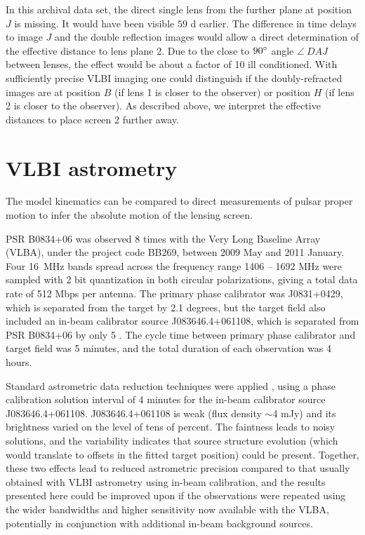 \documentclass[useAMS,usenatbib]{mn2e}
\begin{document}

In this archival data set, the direct single lens from the further
plane at position $J$ is missing.  It would have been visible $59$ d
earlier. The difference in time delays to image $J$ and the double
reflection images would allow a direct determination of the effective
distance to lens plane 2.  Due to the close to $90 \degree$ angle $\angle~DAJ$
between lenses, the effect would be about a factor of 10 ill
conditioned.  With sufficiently precise VLBI imaging one could
distinguish if the doubly-refracted images are at position $B$ (if
lens 1 is closer to the observer) or position $H$ (if lens 2 is closer to the observer).  As described above, we interpret
the effective distances to place screen 2 further away.


\section{VLBI astrometry}
\label{sec:astrometry}

The model kinematics can be compared to direct measurements of pulsar
proper motion to infer the absolute motion of the lensing screen.

PSR B0834+06 was observed 8 times with the Very Long Baseline Array (VLBA), under the project code BB269, between 2009 May and 2011 January.  Four 16~MHz bands spread across the frequency range 1406 -- 1692 MHz were sampled with 2 bit quantization in both circular polarizations, giving a total data rate of 512 Mbps per antenna.  The primary phase calibrator was J0831+0429, which is separated from the target by 2.1 degrees, but the target field also included an in-beam calibrator source J083646.4+061108, which is separated from PSR B0834+06 by only 5 \arcmin.  The cycle time between primary phase calibrator and target field was 5 minutes, and the total duration of each observation was 4 hours.

Standard astrometric data reduction techniques were applied
\citep[e.g.,][]{deller12b,deller13a}, using a phase calibration
solution interval of 4 minutes for the in-beam calibrator source
J083646.4+061108.  J083646.4+061108 is weak (flux density $\sim$4 mJy)
and its brightness varied on the level of tens of percent.  The
faintness leads to noisy solutions, and the variability indicates that
source structure evolution (which would translate to offsets in the
fitted target position) could be present.  Together, these two effects
lead to reduced astrometric precision compared to that usually
obtained with VLBI astrometry using in-beam calibration, and the
results presented here could be improved upon if the observations were
repeated using the wider bandwidths and higher sensitivity now
available with the VLBA, potentially in conjunction with additional
in-beam background sources.
\end{document}
